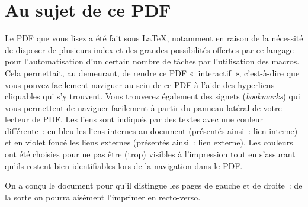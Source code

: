 \section*{Au sujet de ce PDF}

Le PDF que vous lisez a été fait sous \LaTeX{}, notamment en raison de la nécessité de disposer de plusieurs index
et des grandes possibilités offertes par ce langage pour l'automatisation d'un certain nombre de tâches
par l'utilisation des macros. Cela permettait, au demeurant, de rendre ce PDF «~interactif~», c'est-à-dire
que vous pouvez facilement naviguer au sein de ce PDF à l'aide des hyperliens cliquables qui s'y trouvent.
Vous trouverez également des signets (\textit{bookmarks}) qui vous permettent de naviguer facilement à partir du
panneau latéral de votre lecteur de PDF. Les liens sont indiqués par des textes avec une couleur différente~: en bleu les liens internes au document (présentés ainsi~: \textcolor{darkblue!80!black}{lien interne}) et en violet foncé les liens externes (présentés ainsi~: \textcolor{darkviolet!80!black}{lien externe}).
Les couleurs ont été choisies pour ne pas être (trop) visibles à l'impression tout en s'assurant qu'ils restent bien identifiables lors de la navigation dans le PDF.

On a conçu le document pour qu'il distingue les pages de gauche et de droite~: de la sorte on pourra aisément
l'imprimer en recto-verso.

